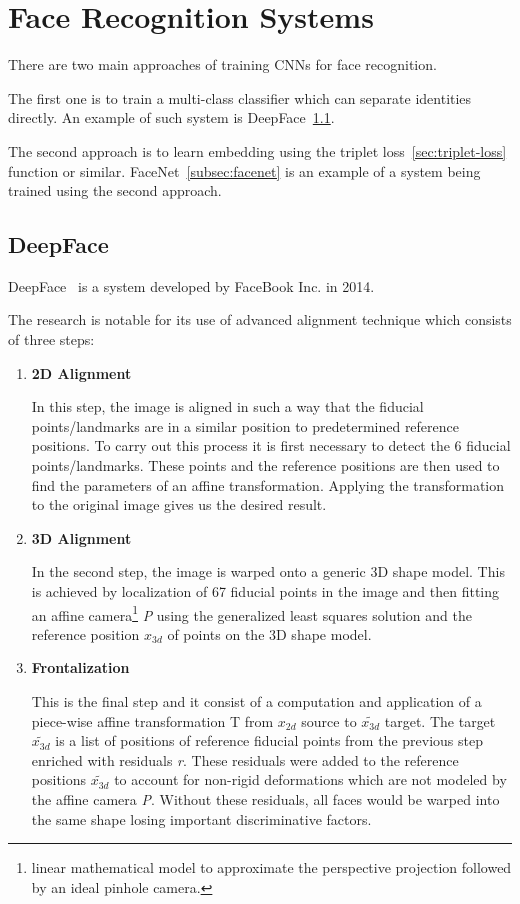 \section{Face Recognition Systems}\label{sec:systems}
There are two main approaches of training CNNs for face recognition.

The first one is to train a multi-class classifier which can separate identities directly.
An example of such system is DeepFace~\ref{subsec:deepface}.

The second approach is to learn embedding using the triplet loss~\ref{sec:triplet-loss} function or similar.
FaceNet~\ref{subsec:facenet} is an example of a system being trained using the second approach.

\subsection{DeepFace}\label{subsec:deepface}
DeepFace~\cite{DeepFace} is a system developed by FaceBook Inc. in 2014.

The research is notable for its use of advanced alignment technique which consists of three steps:

\begin{enumerate}
    \item \textbf{2D Alignment}

    In this step, the image is aligned in such a way that the fiducial points/landmarks are in a similar position
    to predetermined reference positions.
    To carry out this process it is first necessary to detect the 6 fiducial points/landmarks.
    These points and the reference positions are then used to find the parameters of an affine transformation.
    Applying the transformation to the original image gives us the desired result.
    \item \textbf{3D Alignment}

    In the second step, the image is warped onto a generic 3D shape model.
    This is achieved by localization of 67 fiducial points in the image and then fitting an affine
    camera\footnote{linear mathematical model to approximate the perspective projection followed by an ideal
    pinhole camera.} \textit{P} using the generalized least squares solution and the reference position $x_{3d}$ of
    points on the 3D shape model.

    \item \textbf{Frontalization}

    This is the final step and it consist of a computation and application of a piece-wise affine transformation T from
    $x_{2d}$ source to $\tilde{x_{3d}}$ target.
    The target $\tilde{x_{3d}}$ is a list of positions of reference fiducial points from the previous step enriched with
    residuals \textit{r}.
    These residuals were added to the reference positions $\tilde{x_{3d}}$ to account for non-rigid deformations which
    are not modeled by the affine camera \textit{P}.
    Without these residuals, all faces would be warped into the same shape losing important discriminative factors.
\end{enumerate}

